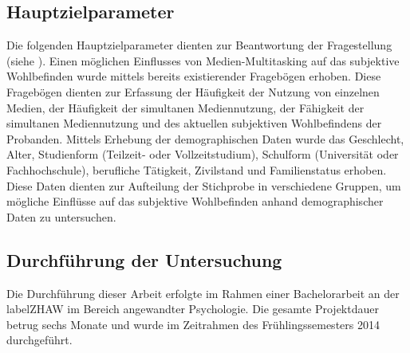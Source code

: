 \subsection{Hauptzielparameter}\label{subsection.hauptzielparameter}
Die folgenden Hauptzielparameter dienten zur Beantwortung der Fragestellung (siehe ). Einen möglichen Einflusses von Medien-Multitasking auf das subjektive Wohlbefinden wurde mittels bereits existierender Fragebögen erhoben. Diese Fragebögen dienten zur Erfassung der Häufigkeit der Nutzung von einzelnen Medien, der Häufigkeit der simultanen Mediennutzung, der Fähigkeit der simultanen Mediennutzung und des aktuellen subjektiven Wohlbefindens der Probanden. Mittels Erhebung der demographischen Daten wurde das Geschlecht, Alter, Studienform (Teilzeit- oder Vollzeitstudium), Schulform (Universität oder Fachhochschule), berufliche Tätigkeit, Zivilstand und Familienstatus erhoben. Diese Daten dienten zur Aufteilung der Stichprobe in verschiedene Gruppen, um mögliche Einflüsse auf das subjektive Wohlbefinden anhand demographischer Daten zu untersuchen.

\subsection{Durchführung der Untersuchung}
Die Durchführung dieser Arbeit erfolgte im Rahmen einer Bachelorarbeit an der \gls{labelZHAW} im Bereich angewandter Psychologie. Die gesamte Projektdauer betrug sechs Monate und wurde im Zeitrahmen des Frühlingssemesters 2014 durchgeführt.

